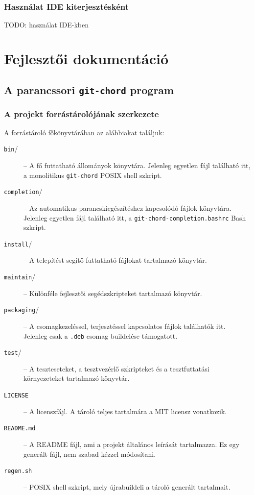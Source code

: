 \documentclass[
]{elteikthesis}[2025/03/25]
\begin{document}
\subsection{Használat IDE kiterjesztésként}

TODO: használat IDE-kben

\cleardoublepage

\chapter{Fejlesztői dokumentáció}

\section{A parancssori \texttt{git-chord} program}

\subsection{A projekt forrástárolójának szerkezete}

A forrástároló főkönyvtárában az alábbiakat találjuk:

\begin{description}
    \item[\texttt{bin}/] --
        A fő futtatható állományok könyvtára.
        Jelenleg egyetlen fájl található itt, a monolitikus \verb|git-chord| POSIX shell szkript.
    \item[\texttt{completion}/] --
        Az automatikus parancskiegészítéshez kapcsolódó fájlok könyvtára.
        Jelenleg egyetlen fájl található itt, a \verb|git-chord-completion.bashrc| Bash szkript.
    \item[\texttt{install}/] --
        A telepítést segítő futtatható fájlokat tartalmazó könyvtár.
    \item[\texttt{maintain}/] --
        Különféle fejlesztői segédszkripteket tartalmazó könyvtár.
    \item[\texttt{packaging}/] --
        A csomagkezeléssel, terjesztéssel kapcsolatos fájlok találhatók itt.
        Jelenleg csak a \verb|.deb| csomag buildelése támogatott.
    \item[\texttt{test}/] --
        A teszteseteket, a tesztvezérlő szkripteket és a tesztfuttatási környezeteket
        tartalmazó könyvtár.
    \item[\texttt{LICENSE}] --
        A licenszfájl.
        A tároló teljes tartalmára a MIT licensz vonatkozik.
    \item[\texttt{README.md}] --
        A README fájl, ami a projekt általános leírását tartalmazza.
        Ez egy generált fájl, nem szabad kézzel módosítani.
    \item[\texttt{regen.sh}] --
        POSIX shell szkript, mely újrabuildeli a tároló generált tartalmait.
\end{description}
\end{document}
